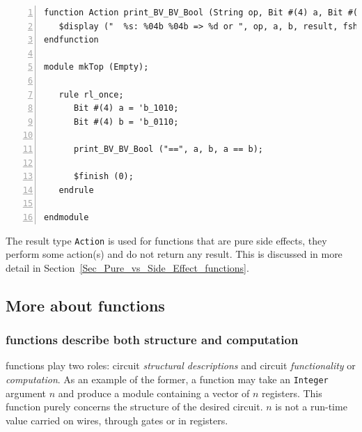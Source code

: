{\footnotesize
\begin{Verbatim}[frame=single, numbers=left]
function Action print_BV_BV_Bool (String op, Bit #(4) a, Bit #(4) b, Bool result);
   $display ("  %s: %04b %04b => %d or ", op, a, b, result, fshow (result));
endfunction

module mkTop (Empty);

   rule rl_once;
      Bit #(4) a = 'b_1010;
      Bit #(4) b = 'b_0110;

      print_BV_BV_Bool ("==", a, b, a == b);

      $finish (0);
   endrule

endmodule
\end{Verbatim}
}

The result type \verb|Action| is used for functions that are pure side
effects, {\ie} they perform some action(s) and do not return any
result.  This is discussed in more detail in
Section~\ref{Sec_Pure_vs_Side_Effect_functions}.






\subsection{More about {\BSV} functions}


\subsubsection{{\BSV} functions describe both structure and computation}


{\BSV} functions play two roles: circuit \emph{structural
descriptions} and circuit \emph{functionality} or \emph{computation}.
As an example of the former, a {\BSV} function may take an
\verb|Integer| argument $n$ and produce a module containing a vector
of $n$ registers.  This function purely concerns the structure of the
desired circuit.  $n$ is not a run-time value carried on wires,
through gates or in registers.

